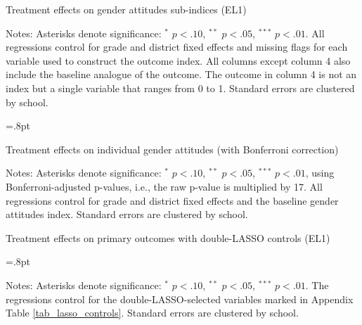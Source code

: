 \documentclass[letterpaper,12pt,pdftex]{article}
\begin{document}
\clearpage
\newpage

\begin{table}
	\tabcolsep=3.8pt
	\caption{Treatment effects on gender attitudes sub-indices (EL1)}
	\label{tab_att_si_el1}
	\vspace{.4cm}
	\begin{center}
		
	\end{center}
	\flushleft \footnotesize {Notes: Asterisks denote significance: $^*$ $p < .10$, $^{**}$ $p < .05$, $^{***}$ $p < .01$. All regressions control for grade and district fixed effects and missing flags for each variable used to construct the outcome index. All columns except column 4 also include the baseline analogue of the outcome. The outcome in column 4 is not an index but a single variable that ranges from 0 to 1. Standard errors are clustered by school.}
\end{table}

\clearpage
\newpage

\begin{table}
	\tabcolsep=.8pt
	\caption{Treatment effects on individual gender attitudes (with Bonferroni correction)}
	\label{tab_genatt_indivars}
	\vspace{.4cm}
	\begin{center}
		\footnotesize{}
	\end{center}
	\flushleft \footnotesize {Notes: Asterisks denote significance: $^*$ $p < .10$, $^{**}$ $p < .05$, $^{***}$ $p < .01$, using Bonferroni-adjusted p-values, i.e., the raw p-value is multiplied by 17. All regressions control for grade and district fixed effects and the baseline gender attitudes index. Standard errors are clustered by school.}
\end{table}
\restoregeometry

\clearpage
\newpage

\begin{landscape}
\begin{table}
\caption{Treatment effects on primary outcomes with double-LASSO controls (EL1)}
\label{tab_extended2}
\centering
\tabcolsep=.8pt
\small

\flushleft \footnotesize {Notes: Asterisks denote significance: $^*$ $p < .10$, $^{**}$ $p < .05$, $^{***}$ $p < .01$. The regressions control for the double-LASSO-selected variables marked in Appendix Table \ref{tab_lasso_controls}. Standard errors are clustered by school.}
\end{table}
\end{landscape}
\restoregeometry
\end{document}
